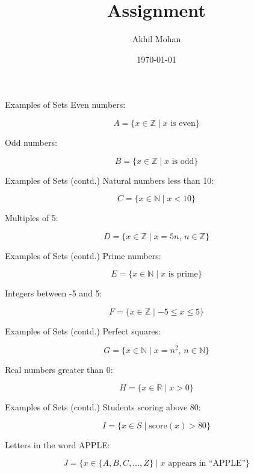 \documentclass{beamer}
\title{Assignment}
\author{Akhil Mohan}
\date{\today}
\begin{document}
\begin{frame}
\titlepage
\end{frame}

\begin{frame}{Examples of Sets}
Even numbers:


\[
A = \{ x \in \mathbb{Z} \mid x \text{ is even} \}
\]



Odd numbers:


\[
B = \{ x \in \mathbb{Z} \mid x \text{ is odd} \}
\]


\end{frame}

\begin{frame}{Examples of Sets (contd.)}
Natural numbers less than 10:


\[
C = \{ x \in \mathbb{N} \mid x < 10 \}
\]



Multiples of 5:


\[
D = \{ x \in \mathbb{Z} \mid x = 5n, \, n \in \mathbb{Z} \}
\]


\end{frame}

\begin{frame}{Examples of Sets (contd.)}
Prime numbers:


\[
E = \{ x \in \mathbb{N} \mid x \text{ is prime} \}
\]



Integers between -5 and 5:


\[
F = \{ x \in \mathbb{Z} \mid -5 \leq x \leq 5 \}
\]


\end{frame}

\begin{frame}{Examples of Sets (contd.)}
Perfect squares:


\[
G = \{ x \in \mathbb{N} \mid x = n^2, \, n \in \mathbb{N} \}
\]



Real numbers greater than 0:


\[
H = \{ x \in \mathbb{R} \mid x > 0 \}
\]


\end{frame}

\begin{frame}{Examples of Sets (contd.)}
Students scoring above 80:


\[
I = \{ x \in S \mid \text{score}(x) > 80 \}
\]



Letters in the word APPLE:


\[
J = \{ x \in \{A,B,C,\dots,Z\} \mid x \text{ appears in ``APPLE''} \}
\]


\end{frame}
\end{document}
